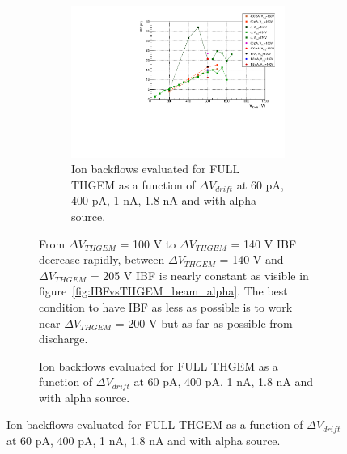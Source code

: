 \documentclass[a4paper, 11 pt]{article}
\newcommand{\Vthgem}{$\Delta V_{THGEM}$}
\newcommand{\Vdrift}{$ \Delta V_{drift}$}
\begin{document}
\begin{figure}[htbp]
\begin{figure}[htbp]
\begin{figure}[htbp]
	\centering
	\includegraphics[width=\textwidth]{Immagini/IBFvsDrift_beam_alpha_average.pdf}
	\caption{Ion backflows evaluated for FULL THGEM as a function of \Vdrift{} at 60 pA, 400 pA, 1 nA, 1.8 nA and with alpha source.}
	\label{fig:IBFvsDrift_beam_alpha_average}
\end{figure}


From \Vthgem{} = 100 V to \Vthgem{} = 140 V IBF decrease rapidly, between \Vthgem{} = 140 V and \Vthgem{} = 205 V IBF is nearly constant as visible in figure~\ref{fig:IBFvsTHGEM_beam_alpha}. The best condition to have IBF as less as possible is to work near \Vthgem{} = 200 V but as far as possible from discharge.\\



\end{figure}
\end{figure}
\end{document}
